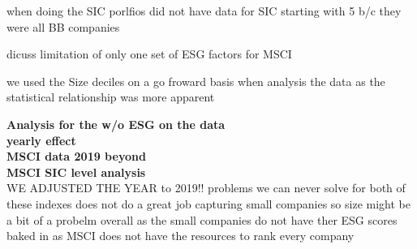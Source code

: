 when doing the SIC porlfios did not have data for SIC starting with 5 b/c they were all BB companies 
 
 
 
 dicuss limitation of only one set of ESG factors for MSCI 
 
 we used the Size deciles on a go froward basis when analysis the data as the statistical relationship was more apparent 
 
 \textbf{Analysis for the w/o ESG on the data}\\
 \textbf{yearly effect}\\
 
 \textbf{MSCI data 2019 beyond}\\
 
 \textbf{MSCI SIC level analysis}\\
 WE ADJUSTED THE YEAR to 2019!!
 problems we can never solve for both of these indexes does not do a great job capturing small companies so size might be a bit of a probelm overall as the small companies do not have ther ESG scores baked in as MSCI does not have the resources to rank every company